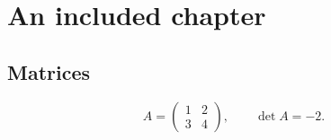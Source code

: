\section{An included chapter}
\subsection{Matrices}
\[
  A = \begin{pmatrix} 1 & 2 \\ 3 & 4 \end{pmatrix}, \qquad \det A = -2.
\]
